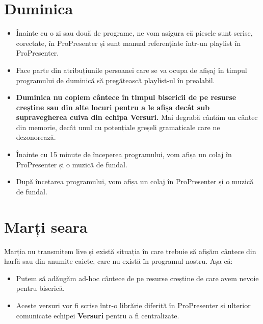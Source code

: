 \documentclass[epjST]{svjour}
\begin{document}
  \section{Duminica}
  \label{sec:3}
  \begin{itemize}
    \item Înainte cu o zi sau două de programe, ne vom asigura că piesele sunt
      scrise, corectate, în ProPresenter și sunt manual referențiate într-un
      playlist în ProPresenter.

    \item Face parte din atribuțiunile persoanei care se va ocupa de afișaj în timpul
      programului de duminică să pregătească playlist-ul în prealabil.

    \item \textbf{Duminica nu copiem cântece în timpul bisericii de pe resurse
      creștine sau din alte locuri pentru a le afișa decât sub supravegherea
      cuiva din echipa \textbf{Versuri}.} Mai degrabă cântăm un cântec din
      memorie, decât unul cu potențiale greșeli gramaticale care ne dezonorează.

    \item Înainte cu 15 minute de începerea programului, vom afișa un colaj în
      ProPresenter și o muzică de fundal.

    \item După încetarea programului, vom afișa un colaj în ProPresenter și o
      muzică de fundal.
  \end{itemize}

  \section{Marți seara}
  \label{sec:6} Marția nu transmitem live și există situația în care trebuie să afișăm
  cântece din harfă sau din anumite caiete, care nu există în programul nostru. Așa
  că:
  \begin{itemize}
    \item Putem să adăugăm ad-hoc cântece de pe resurse creștine de care avem nevoie
      pentru biserică.

    \item Aceste versuri vor fi scrise într-o librărie diferită în ProPresenter și
      ulterior comunicate echipei \textbf{Versuri} pentru a fi centralizate.
  \end{itemize}
\end{document}
